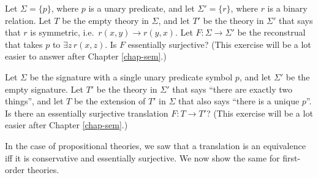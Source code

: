 


\begin{exercise} Let $\Sigma = \{ p\}$, where $p$ is a unary
  predicate, and let $\Sigma ' = \{ r \}$, where $r$ is a binary
  relation.  Let $T$ be the empty theory in $\Sigma$, and let $T'$ be
  the theory in $\Sigma '$ that says that $r$ is symmetric, i.e.\
  $r(x,y)\to r(y,x)$.  Let $F:\Sigma\to\Sigma '$ be the reconstrual
  that takes $p$ to $\exists z\,r(x,z)$.  Is $F$ essentially
  surjective? (This exercise will be a lot easier to answer after
  Chapter \ref{chap-sem}.) \end{exercise}




\begin{exercise} Let $\Sigma$ be the signature with a single unary
  predicate symbol $p$, and let $\Sigma '$ be the empty signature.
  Let $T'$ be the theory in $\Sigma '$ that says ``there are exactly
  two things'', and let $T$ be the extension of $T'$ in $\Sigma$ that
  also says ``there is a unique $p$''.  Is there an essentially
  surjective translation $F:T\to T'$?  (This exercise will be a lot
  easier after Chapter \ref{chap-sem}.)
\end{exercise}




In the case of propositional theories, we saw that a translation is an
equivalence iff it is conservative and essentially surjective.  We now
show the same for first-order theories.

